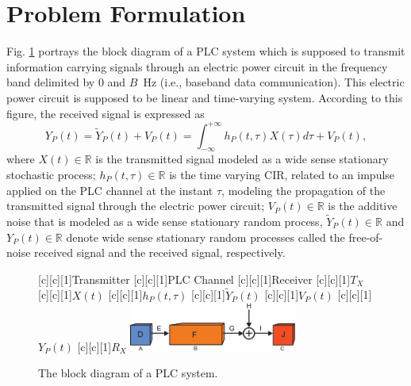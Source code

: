 \documentclass[journal]{IEEEtran}
\begin{document}
\section{Problem Formulation}

Fig. \ref{PLCchannel} portrays the block diagram of a \ac{PLC} system which is supposed to transmit information carrying signals through an electric power circuit in the frequency band delimited by $0$ and $B$~Hz (i.e., baseband data communication). This electric power circuit is supposed to be linear and time-varying system. According to this figure, the received signal is expressed as
\begin{equation} \label{received signal}
Y_P(t) = \tilde{Y}_P(t)+V_P(t) = \int_{-\infty}^{+\infty} h_P(t,\tau) X(\tau) d\tau + V_P(t),
\end{equation}
where $X(t)\in \mathbb{R}$ is the transmitted signal modeled as a wide sense stationary stochastic process; $h_P(t,\tau)\in \mathbb{R}$ is the time varying \ac{CIR}, related to an impulse applied on the \ac{PLC} channel at the instant $\tau$, modeling the propagation of the transmitted signal through the electric power circuit; $V_P(t)\in \mathbb{R}$ is the additive noise that is modeled as a wide sense stationary random process, $\tilde{Y}_P(t)\in \mathbb{R}$ and $Y_P(t)\in \mathbb{R}$ denote wide sense stationary random processes called the free-of-noise received signal and the received signal, respectively.

\begin{figure}[h]
	\centering
	[c][1]{Transmitter}
	[c][1]{PLC Channel}
	[c][1]{Receiver}
	[c][1]{$T_X$}
	[c][1]{$X(t)$}
	[c][1]{$h_P(t,\tau)$}
	[c][1]{$\tilde{Y}_P(t)$}
	[c][1]{$V_P(t)$}
	[c][1]{$Y_P(t)$}
	[c][1]{$R_X$}
	\includegraphics[width=0.49\textwidth]{images/PLCchannel.eps}
	\caption{The block diagram of a PLC system.}
	\label{PLCchannel}
\end{figure}
\end{document}
